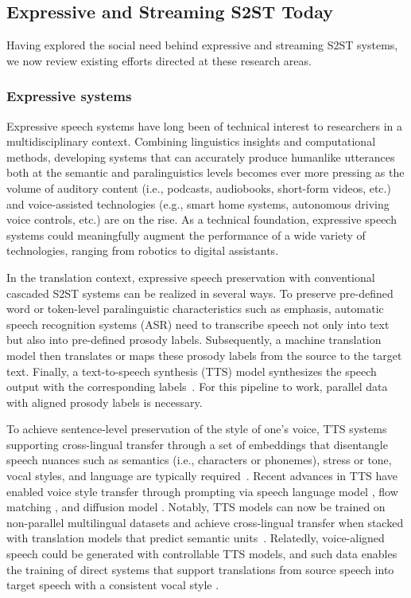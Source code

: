 \subsection{Expressive and Streaming S2ST Today}

Having explored the social need behind expressive and streaming S2ST systems, we now review existing efforts directed at these research areas. 

\subsubsection{Expressive systems}


Expressive speech systems have long been of technical interest to researchers in a multidisciplinary context. Combining linguistics insights and computational methods, developing systems that can accurately produce humanlike utterances both at the semantic and paralinguistics levels becomes ever more pressing as the volume of auditory content (i.e., podcasts, audiobooks, short-form videos, etc.) and voice-assisted technologies (e.g., smart home systems, autonomous driving voice controls, etc.) are on the rise. As a technical foundation, expressive speech systems could meaningfully augment the performance of a wide variety of technologies, ranging from robotics to digital assistants.

In the translation context, expressive speech preservation with conventional cascaded S2ST systems can be realized in several ways.
To preserve pre-defined word or token-level paralinguistic characteristics such as emphasis, automatic speech recognition systems (ASR) need to transcribe speech not only into text but also into pre-defined prosody labels. Subsequently, a machine translation model then translates or maps these prosody labels from the source to the target text. Finally, a text-to-speech synthesis (TTS) model synthesizes the speech output with the corresponding labels~\citep{aguero2006prosody,do2017toward}. For this pipeline to work, parallel data with aligned prosody labels is necessary.

To achieve sentence-level preservation of the style of one's voice, TTS systems supporting cross-lingual transfer through a set of embeddings that disentangle speech nuances such as semantics (i.e., characters or phonemes), stress or tone, vocal styles, and language are typically required~\citep{liu2019cross,casanova2022yourtts}.
Recent advances in TTS have enabled voice style transfer through prompting via speech language model \citep{valle}, flow matching \citep{le2023voicebox}, and diffusion model \citep{Shen2023NaturalSpeech2L}.
Notably, TTS models can now be trained on non-parallel multilingual datasets and achieve cross-lingual transfer when stacked with translation models that predict semantic units~\citep{audiolm,audiopalm,polyvoice,s2st-style}.
Relatedly, voice-aligned speech could be generated with controllable TTS models, and such data enables the training of direct \sst systems that support translations from source speech into target speech with a consistent vocal style \citep{pmlr-v162-jia22b}.



